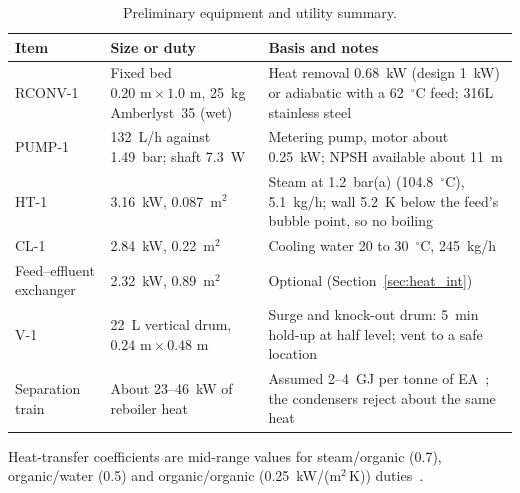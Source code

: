 \documentclass[10pt,a4paper]{article}
\newcommand{\hdrrow}{}
\newcommand{\tabnote}[1]{\par\vspace{2pt}\begin{minipage}{\textwidth}\justifying\footnotesize #1\end{minipage}}
\begin{document}
\begin{table}[H]
\centering
\caption{Preliminary equipment and utility summary.}
\label{tab:equip}
\small
\begin{tabularx}{\textwidth}{|C{2.8cm}|C{4.2cm}|Y|}
\hline
\hdrrow
\textbf{Item} & \textbf{Size or duty} & \textbf{Basis and notes} \\
\hline
RCONV-1 & Fixed bed $0.20\text{ m} \times 1.0\text{ m}$, 25~kg Amberlyst~35 (wet) & Heat removal 0.68~kW (design 1~kW) or adiabatic with a 62~$^\circ$C feed; 316L stainless steel \\
\hline
PUMP-1 & 132~L/h against 1.49~bar; shaft 7.3~W & Metering pump, motor about 0.25~kW; NPSH available about 11~m \\
\hline
HT-1 & 3.16~kW, 0.087~m$^2$ & Steam at 1.2~bar(a) (104.8~$^\circ$C), 5.1~kg/h; wall 5.2~K below the feed's bubble point, so no boiling \\
\hline
CL-1 & 2.84~kW, 0.22~m$^2$ & Cooling water 20 to 30~$^\circ$C, 245~kg/h \\
\hline
Feed--effluent exchanger & 2.32~kW, 0.89~m$^2$ & Optional (Section~\ref{sec:heat_int}) \\
\hline
V-1 & 22~L vertical drum, $0.24\text{ m} \times 0.48\text{ m}$ & Surge and knock-out drum: 5~min hold-up at half level; vent to a safe location \\
\hline
Separation train & About 23--46~kW of reboiler heat & Assumed 2--4~GJ per tonne of EA~\cite{ref16}; the condensers reject about the same heat \\
\hline
\end{tabularx}
\tabnote{Heat-transfer coefficients are mid-range values for steam/organic (0.7), organic/water (0.5) and organic/organic (0.25~kW/(m$^2$\,K)) duties~\cite{ref17}.}
\end{table}
\end{document}
